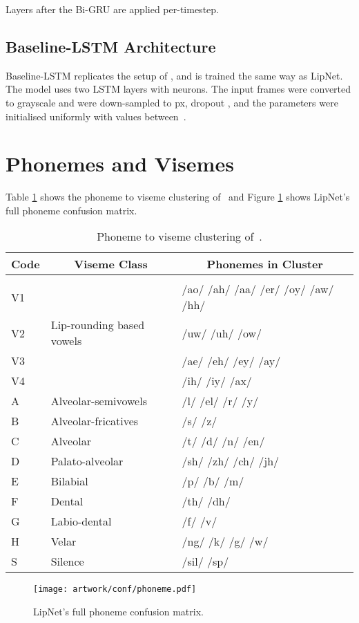 \documentclass{article}
\begin{document}
Layers after the Bi-GRU are applied per-timestep.

\subsection{Baseline-LSTM Architecture}

Baseline-LSTM replicates the setup of \cite{wand2016lipreading}, and is trained the same way as LipNet. The model uses two LSTM layers with  neurons. The input frames were converted to grayscale and were down-sampled to px, dropout , and the parameters were initialised uniformly with values between~.


\section{Phonemes and Visemes}
\label{app:phonemesvisemes}

Table \ref{tbl:neti} shows the phoneme to viseme clustering of~\cite{neti2000audio} and Figure \ref{fig:conf_phoneme} shows LipNet's full phoneme confusion matrix.

\begin{table}[htb]
\caption{Phoneme to viseme clustering of~\cite{neti2000audio}.}
\label{tbl:neti}
\begin{center}
\begin{tabular}{lll}
\multicolumn{1}{c}{\bf Code}  &\multicolumn{1}{c}{\bf Viseme Class}  &\multicolumn{1}{c}{\bf Phonemes in Cluster}
\\ \hline \\
V1 & & /ao/ /ah/ /aa/ /er/ /oy/ /aw/ /hh/ \\
V2 & Lip-rounding based vowels & /uw/ /uh/ /ow/ \\
V3 & & /ae/ /eh/ /ey/ /ay/ \\
V4 & & /ih/ /iy/ /ax/ \\
A & Alveolar-semivowels & /l/ /el/ /r/ /y/ \\
B & Alveolar-fricatives & /s/ /z/ \\
C & Alveolar & /t/ /d/ /n/ /en/ \\
D & Palato-alveolar & /sh/ /zh/ /ch/ /jh/ \\
E & Bilabial & /p/ /b/ /m/ \\
F & Dental & /th/ /dh/ \\
G & Labio-dental & /f/ /v/ \\
H & Velar & /ng/ /k/ /g/ /w/ \\
S & Silence & /sil/ /sp/ 
\end{tabular} 
\end{center}
\end{table}


\begin{figure}[htb]
  \centering
  \texttt{[image: artwork/conf/phoneme.pdf]}
  \caption{LipNet's full phoneme confusion matrix.}
  \label{fig:conf_phoneme}
\end{figure}








 
\end{document}
